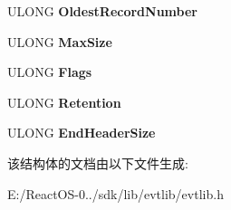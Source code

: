 \begin{DoxyCompactItemize}
U\+L\+O\+NG {\bfseries Oldest\+Record\+Number}
\item 
\mbox{\label{struct___e_v_e_n_t_l_o_g_h_e_a_d_e_r_ad944ac082ed67c7808ba31ffb9c0a292}} 
U\+L\+O\+NG {\bfseries Max\+Size}
\item 
\mbox{\label{struct___e_v_e_n_t_l_o_g_h_e_a_d_e_r_a9104e2df5fea31e3a106d6cda41091ce}} 
U\+L\+O\+NG {\bfseries Flags}
\item 
\mbox{\label{struct___e_v_e_n_t_l_o_g_h_e_a_d_e_r_a8bc83f517512a44c2dbbb0a9a74c20be}} 
U\+L\+O\+NG {\bfseries Retention}
\item 
\mbox{\label{struct___e_v_e_n_t_l_o_g_h_e_a_d_e_r_aa8a057b707a8d1b59bc8e595f2d1549e}} 
U\+L\+O\+NG {\bfseries End\+Header\+Size}
\end{DoxyCompactItemize}


该结构体的文档由以下文件生成\+:\begin{DoxyCompactItemize}
\item 
E\+:/\+React\+O\+S-\/0../sdk/lib/evtlib/evtlib.\+h\end{DoxyCompactItemize}
